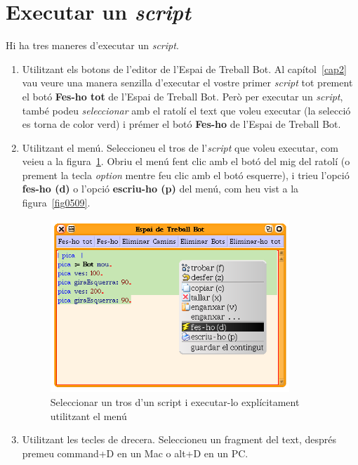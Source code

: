 \section{Executar un \emph{script}}
Hi ha tres maneres d'executar un \emph{script}.

\begin{enumerate}
\item Utilitzant els botons de l'editor de l'\textsf{Espai de Treball Bot}. Al capítol~\ref{cap2} vau veure una manera senzilla d'executar el vostre primer \emph{script} tot prement el botó \textbf{Fes-ho tot} de l'\textsf{Espai de Treball Bot}. Però per executar un \emph{script}, també podeu \emph{seleccionar} amb el ratolí el text que voleu executar (la selecció es torna de color verd) i prémer el botó \textbf{Fes-ho} de l'\textsf{Espai de Treball Bot}.
\item Utilitzant el menú. Seleccioneu el tros de l'\emph{script} que voleu executar, com veieu a la figura~\ref{fig0510}. Obriu el menú fent clic amb el botó del mig del ratolí (o prement la tecla \emph{option} mentre feu clic amb el botó esquerre), i trieu l'opció \textbf{fes-ho (d)} o l'opció \textbf{escriu-ho (p)} del menú, com heu vist a la figura~\ref{fig0509}.   
\begin{figure}[h]
\begin{center}
\includegraphics[height=65mm ,width=90mm ]{Imatges/figura5-10.png}
\end{center}
\caption{Seleccionar un tros d'un script i executar-lo explícitament utilitzant el menú}
\label{fig0510}
\end{figure}
\item Utilitzant les tecles de drecera. Seleccioneu un fragment del text, després premeu command+D en un Mac o alt+D en un PC.
\end{enumerate}

